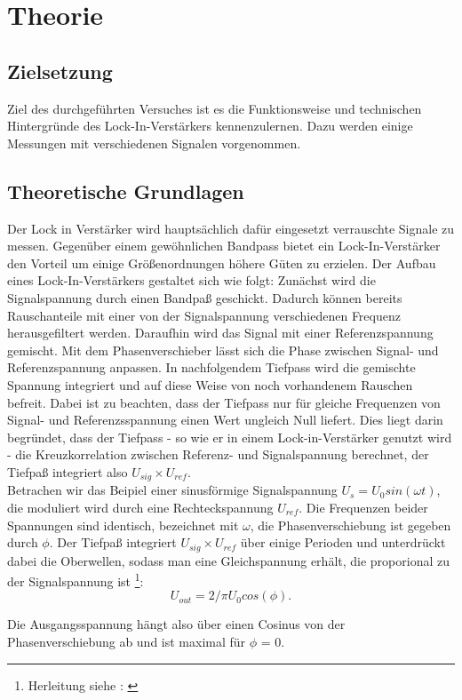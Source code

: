 \section{Theorie}
\label{sec:Theorie}
\subsection{Zielsetzung}
\label{sec:Zielsetzung}
Ziel des durchgeführten Versuches ist es die Funktionsweise und technischen
Hintergründe des Lock-In-Verstärkers kennenzulernen. Dazu werden einige
Messungen mit verschiedenen Signalen vorgenommen.

\subsection{Theoretische Grundlagen}
\label{sec:Grundlagen}
Der Lock in Verstärker wird hauptsächlich dafür eingesetzt verrauschte Signale
zu messen. Gegenüber einem gewöhnlichen Bandpass bietet ein Lock-In-Verstärker
den Vorteil um einige Größenordnungen höhere Güten zu erzielen.
Der Aufbau eines Lock-In-Verstärkers gestaltet sich wie folgt:
Zunächst wird die Signalspannung durch einen Bandpaß geschickt. Dadurch
können bereits Rauschanteile mit einer von der Signalspannung verschiedenen
Frequenz herausgefiltert werden.
Daraufhin wird das Signal mit einer Referenzspannung gemischt. Mit dem
Phasenverschieber lässt sich die Phase zwischen Signal- und Referenzspannung
anpassen.
In nachfolgendem Tiefpass wird die gemischte Spannung integriert und auf diese
Weise von noch vorhandenem Rauschen befreit. Dabei ist zu beachten, dass der
Tiefpass nur für gleiche Frequenzen von Signal- und Referenzsspannung
einen Wert ungleich Null liefert. Dies liegt
darin begründet, dass der Tiefpass - so wie er in einem Lock-in-Verstärker
genutzt wird - die Kreuzkorrelation zwischen Referenz- und Signalspannung
berechnet, der Tiefpaß integriert also $U_{sig} \times U_{ref}$.\\

Betrachen wir das Beipiel einer sinusförmige Signalspannung $U_s = U_0 sin(\omega
t)$, die moduliert wird durch eine Rechteckspannung $U_{ref}$. Die Frequenzen
beider Spannungen sind identisch, bezeichnet mit $\omega$,
die Phasenverschiebung ist gegeben durch $\phi$.
Der Tiefpaß integriert $U_{sig} \times U_{ref}$ über einige Perioden und
unterdrückt dabei die Oberwellen, sodass man eine Gleichspannung erhält, die
proporional zu der Signalspannung
ist \footnote{Herleitung siehe : \cite[1-3]{Anleitung}}:
\begin{equation}
U_{out} = 2/\pi U_0cos(\phi).
\label{eqn:Uout}
\end{equation}



Die Ausgangsspannung hängt also über einen Cosinus
von der Phasenverschiebung ab und ist maximal
für $\phi$ = 0.
